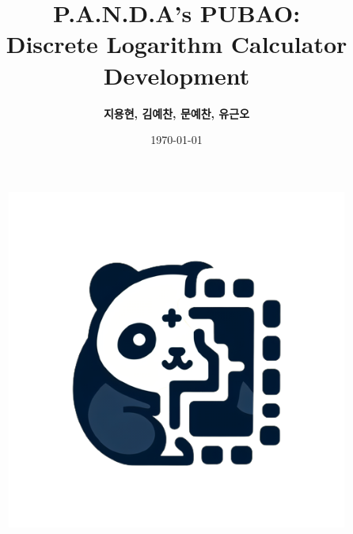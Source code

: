 \documentclass[12pt,a4paper]{article}
\title{P.A.N.D.A's PUBAO: \\Discrete Logarithm Calculator Development}
\author{\textcolor{lightblue!50!black}{\bf 지용현, 김예찬, 문예찬, 유근오}}
\date{\today}
\begin{document}
	
	\maketitle
	\thispagestyle{empty}  %
	\begin{figure}[h!]
		\centering
		\includegraphics[scale=.5]{panda4.png}
	\end{figure}
	\newpage  %
	
	\tableofcontents
	\newpage
\end{document}
